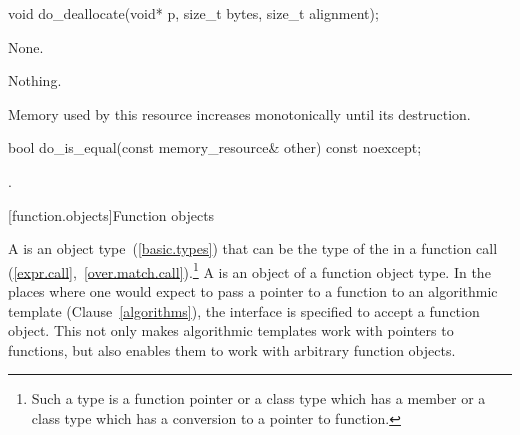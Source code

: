 %
\begin{itemdecl}
void do_deallocate(void* p, size_t bytes, size_t alignment);
\end{itemdecl}

\begin{itemdescr}
\pnum
\effects
None.

\pnum
\throws
Nothing.

\pnum
\remarks
Memory used by this resource increases monotonically until its destruction.
\end{itemdescr}

%
\begin{itemdecl}
bool do_is_equal(const memory_resource& other) const noexcept;
\end{itemdecl}

\begin{itemdescr}
\pnum
\returns
{}.
\end{itemdescr}


[function.objects]{Function objects}

\pnum
A  is an object
type~(\ref{basic.types}) that can be the type of the
 in a function call
(\ref{expr.call},~\ref{over.match.call}).\footnote{Such a type is a function
pointer or a class type which has a member  or a class type
which has a conversion to a pointer to function.} A  is an
object of a function object type. In the places where one would expect to pass a
pointer to a function to an algorithmic template (Clause~\ref{algorithms}), the
interface is specified to accept a function object. This not only makes
algorithmic templates work with pointers to functions, but also enables them to
work with arbitrary function objects.

\pnum
{}

